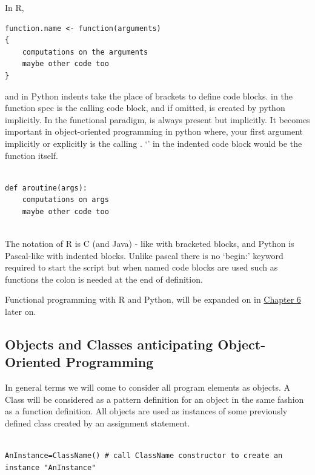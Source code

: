 \documentclass[]{book}
\theoremstyle{definition}
\theoremstyle{definition}
\theoremstyle{definition}
\theoremstyle{remark}
\begin{document}
In R,

\begin{verbatim}
function.name <- function(arguments) 
{
    computations on the arguments
    maybe other code too
}
\end{verbatim}

and in Python indents take the place of brackets to define code blocks.
 in the function spec is the calling code block, and if
omitted, is created by python implicitly. In the functional paradigm,
 is always present but implicitly. It becomes important in
object-oriented programming in python where, your first argument
implicitly or explicitly is the calling .
`' in the indented code block would be the function itself.

\begin{verbatim}

def aroutine(args):
    computations on args
    maybe other code too
  
\end{verbatim}

The notation of R is C (and Java) - like with bracketed blocks, and
Python is Pascal-like with indented blocks. Unlike pascal there is no
`begin:' keyword required to start the script but when named code blocks
are used such as functions the colon is needed at the end of definition.

Functional programming with R and Python, will be expanded on in
\href{06-Functional_Programming.Rmd}{Chapter 6} later on.

\subsection{\texorpdfstring{Objects and Classes anticipating
Object-Oriented Programming
}{Objects and Classes anticipating Object-Oriented Programming }}\label{objects-and-classes-anticipating-object-oriented-programming}

In general terms we will come to consider all program elements as
objects. A Class will be considered as a pattern definition for an
object in the same fashion as a function definition. All objects are
used as instances of some previously defined class created by an
assignment statement.

\begin{verbatim}

AnInstance=ClassName() # call ClassName constructor to create an instance "AnInstance"

\end{verbatim}
\end{document}
